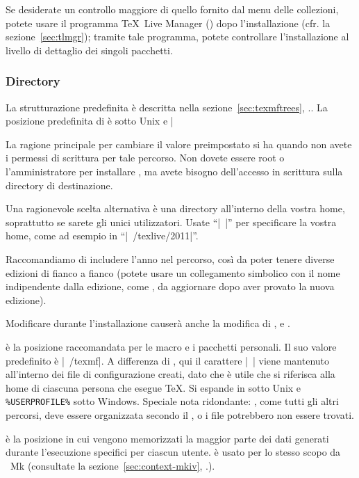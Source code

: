 \documentclass{article}
\begin{document}
Se desiderate un controllo maggiore di quello fornito dal menu delle
collezioni, potete usare il programma \TeX\ Live Manager ()
dopo l'installazione (cfr. la sezione~\ref{sec:tlmgr}); tramite tale
programma, potete controllare l'installazione al livello di dettaglio dei
singoli pacchetti.

\subsubsection{Directory}
\label{sec:directories}

La strutturazione predefinita è descritta nella
sezione~\ref{sec:texmftrees}, \p.\pageref{sec:texmftrees}. La posizione
predefinita di  è  sotto
Unix e |%

La ragione principale per cambiare il valore preimpostato si ha quando non
avete i permessi di scrittura per tale percorso. Non dovete essere root o
l'amministratore per installare \TL, ma avete bisogno dell'accesso in
scrittura sulla directory di destinazione.

Una ragionevole scelta alternativa è una directory all'interno della
vostra home, soprattutto se sarete gli unici utilizzatori. Usate ``|~|''
per specificare la vostra home, come ad esempio in ``|~/texlive/2011|''.

Raccomandiamo di includere l'anno nel percorso, così da poter tenere
diverse edizioni di \TL{} fianco a fianco (potete usare un collegamento
simbolico con il nome indipendente dalla edizione, come
, da aggiornare dopo aver provato la nuova
edizione).

Modificare  durante l'installazione causerà anche la
modifica di ,  e
.

 è la posizione raccomandata per le macro e i pacchetti
personali. Il suo valore predefinito è |~/texmf|. A differenza di
, qui il carattere |~| viene mantenuto all'interno dei
file di configurazione creati, dato che è utile che si riferisca alla home
di ciascuna persona che esegue \TeX. Si espande in  sotto
Unix e \verb|%USERPROFILE%| sotto Windows. Speciale nota ridondante:
, come tutti gli altri percorsi, deve essere organizzata
secondo il \TDS, o i file potrebbero non essere trovati. %

 è la posizione in cui vengono memorizzati la maggior
parte dei dati generati durante l'esecuzione specifici per ciascun utente.
 è usato per lo stesso scopo da \ConTeXt\ Mk
(consultate la sezione~\ref{sec:context-mkiv},
\p.\pageref{sec:context-mkiv}).
\end{document}
